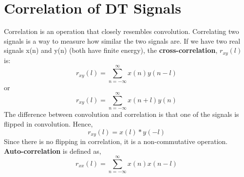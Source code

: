 \documentclass{article} %
\begin{document}
	\section{Correlation of DT Signals}
	Correlation is an operation that closely resembles convolution. Correlating two signals is a way to measure how similar the two signals are. If we have two real signals x(n) and y(n) (both have finite energy), the \textbf{cross-correlation}, $r_{xy}(l)$ is:
	\begin{equation}
 	r_{xy}(l) = \sum_{n = -\infty}^\infty x(n)y(n-l)
	\end{equation}
	or 
	\begin{equation}
 	r_{xy}(l) = \sum_{n = -\infty}^\infty x(n+l)y(n)
	\end{equation}
	The difference between convolution and correlation is that one of the signals is flipped in convolution. Hence,
	\begin{equation}
 	r_{xy}(l) = x(l) \ast y(-l)
	\end{equation}
	Since there is no flipping in correlation, it is a non-commutative operation. \textbf{Auto-correlation} is defined as,
	\begin{equation}
 	r_{xx}(l) = \sum_{n = -\infty}^\infty x(n)x(n-l)
	\end{equation}
	
\end{document}

